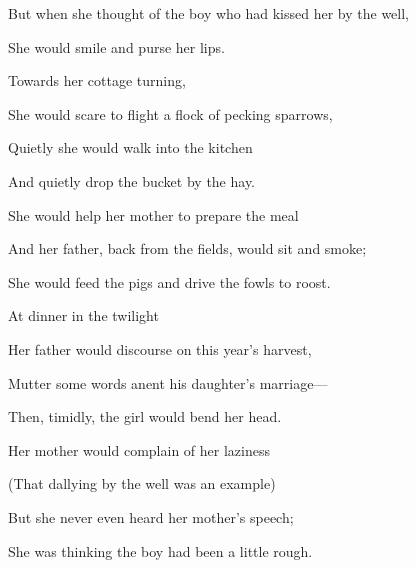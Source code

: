 {But when she thought of the boy who had kissed her by the well,

She would smile and purse her lips.

Towards her cottage turning,

She would scare to flight a flock of pecking sparrows,

Quietly she would walk into the kitchen

And quietly drop the bucket by the hay.

She would help her mother to prepare the meal

And her father, back from the fields, would sit and smoke;

She would feed the pigs and drive the fowls to roost.

At dinner in the twilight

Her father would discourse on this year’s harvest,

Mutter some words anent his daughter’s marriage—

Then, timidly, the girl would bend her head.

Her mother would complain of her laziness

(That dallying by the well was an example)

But she never even heard her mother’s speech;

She was thinking the boy had been a little rough.

}
